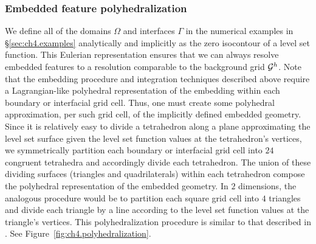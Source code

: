 \subsubsection{Embedded feature polyhedralization} \label{subsubsec:ch4.polyhedralization}

We define all of the domains $\Omega$ and interfaces $\Gamma$ in the numerical examples in \S\ref{sec:ch4.examples} analytically and implicitly as the zero isocontour of a level set function. This Eulerian representation ensures that we can always resolve embedded features to a resolution comparable to the background grid $\mathcal{G}^h$. Note that the embedding procedure and integration techniques described above require a Lagrangian-like polyhedral representation of the embedding within each boundary or interfacial grid cell. Thus, one must create some polyhedral approximation, per such grid cell, of the implicitly defined embedded geometry. Since it is relatively easy to divide a tetrahedron along a plane approximating the level set surface given the level set function values at the tetrahedron's vertices, we symmetrically partition each boundary or interfacial grid cell into $24$ congruent tetrahedra and accordingly divide each tetrahedron. The union of these dividing surfaces (triangles and quadrilaterals) within each tetrahedron compose the polyhedral representation of the embedded geometry. In $2$ dimensions, the analogous procedure would be to partition each square grid cell into $4$ triangles and divide each triangle by a line according to the level set function values at the triangle's vertices. This polyhedralization procedure is similar to that described in \cite{Min.Chohong07}. See Figure~\ref{fig:ch4.polyhedralization}.

